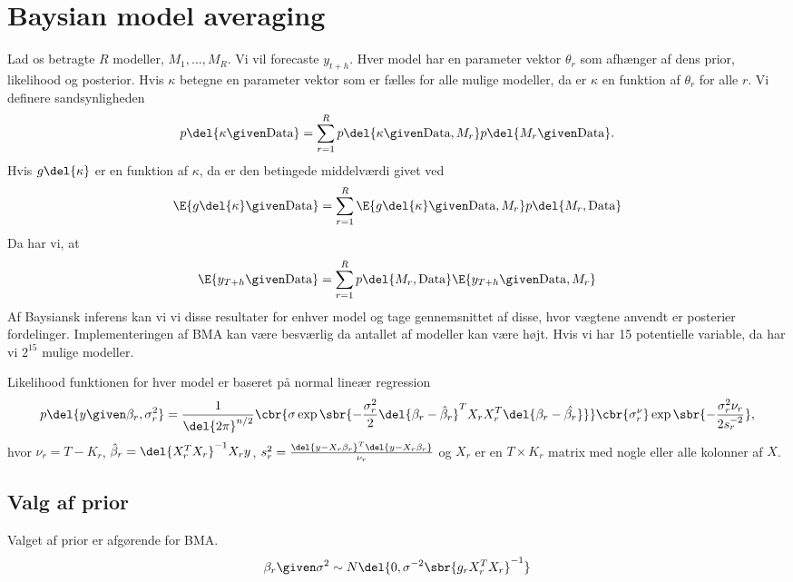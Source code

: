 \chapter{Baysian model averaging}

Lad os betragte $R$ modeller, $M_1, \ldots, M_R$.
Vi vil forecaste $y_{t+h}$.
Hver model har en parameter vektor $\theta_r$ som afhænger af dens prior, likelihood og posterior.
Hvis $\kappa$ betegne en parameter vektor som er fælles for alle mulige modeller, da er $\kappa$ en funktion af $\theta_r$ for alle $r$.
Vi definere sandsynligheden
\begin{align*}
p \del{\kappa \given \text{Data}} = \sum_{r=1}^R p \del{\kappa \given \text{Data}, M_r} p \del{M_r \given \text{Data}}.
\end{align*}
Hvis $g \del{\kappa}$ er en funktion af $\kappa$, da er den betingede middelværdi givet ved
\begin{align*}
\E{g\del{\kappa} \given \text{Data}} = \sum_{r=1}^R \E{g \del{\kappa} \given \text{Data}, M_r} p \del{M_r, \text{Data}}
\end{align*}
Da har vi, at
\begin{align*}
\E{y_{T+h} \given \text{Data}} = \sum_{r=1}^R p \del{M_r, \text{Data}} \E{y_{T+h} \given \text{Data}, M_r}
\end{align*}
Af Baysiansk inferens kan vi vi disse resultater for enhver model og tage gennemsnittet af disse, hvor vægtene anvendt er posterier fordelinger.
Implementeringen af BMA kan være besværlig da antallet af modeller kan være højt.
Hvis vi har 15 potentielle  variable, da har vi $2^{15}$ mulige modeller.


Likelihood funktionen for hver model er baseret på normal lineær regression
\begin{align*}
p \del{y \given \beta_r, \sigma_r^2} = \frac{1}{\del{2 \pi}^{n/2}} \cbr{\sigma \exp \sbr{- \frac{\sigma_r^2}{2} \del{\beta_r - \hat{\beta}_r}^T X_r X_r^T \del{\beta_r - \hat{\beta_r}}}} \cbr{\sigma_r^\nu} \exp \sbr{- \frac{\sigma_r^2 \nu_r}{2 s_r^{-2}}},
\end{align*}
hvor $\nu_r = T-K_r$, $\hat{\beta}_r = \del{X_r^T X_r}^{-1}X_r y$, $s_r^2 = \frac{\del{y-X_r \beta_r}^T\del{y-X_r \beta_r}}{\nu_r}$ og $X_r$ er en $T \times K_r$ matrix med nogle eller alle kolonner af $X$.

\section{Valg af prior}
Valget af prior er afgørende for BMA.
\begin{align*}
\beta_r \given \sigma^2 \sim N\del{0,\sigma^{-2}\sbr{g_r X_r^T X_r}^{-1}}
\end{align*}